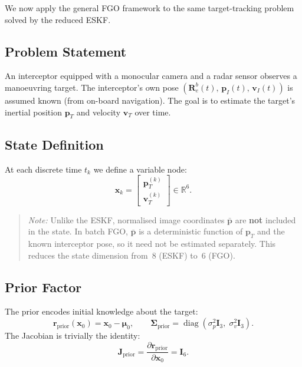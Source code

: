 \documentclass[11pt,a4paper]{article}
\newcommand{\state}{\bm{x}}
\newcommand{\resid}{\bm{r}}
\newcommand{\jac}{\bm{J}}
\newcommand{\eye}{\bm{I}}
\newcommand{\cov}{\bm{\Sigma}}
\newcommand{\R}{\mathbb{R}}
\DeclareMathOperator{\diag}{diag}
\begin{document}
We now apply the general FGO framework to the same target-tracking
problem solved by the reduced ESKF.

\subsection{Problem Statement}

An interceptor equipped with a monocular camera and a radar sensor
observes a manoeuvring target.  The interceptor's own pose
$(\bm{R}^b_e(t),\, \bm{p}_I(t),\, \bm{v}_I(t))$ is assumed known
(from on-board navigation).  The goal is to estimate the target's
inertial position $\bm{p}_T$ and velocity $\bm{v}_T$ over time.

\subsection{State Definition}

At each discrete time $t_k$ we define a variable node:
\begin{equation}
  \state_k
  = \begin{bmatrix} \bm{p}_T^{(k)} \\ \bm{v}_T^{(k)} \end{bmatrix}
  \in \R^{6}.
  \label{eq:state_def}
\end{equation}

\begin{quote}
\emph{Note:} Unlike the ESKF, normalised image coordinates $\bar{\bm{p}}$
are \textbf{not} included in the state.  In batch FGO, $\bar{\bm{p}}$
is a deterministic function of $\bm{p}_T$ and the known interceptor
pose, so it need not be estimated separately.  This reduces the state
dimension from~8 (ESKF) to~6 (FGO).
\end{quote}

\subsection{Prior Factor}
\label{sec:prior}

The prior encodes initial knowledge about the target:
\begin{equation}
  \resid_{\text{prior}}(\state_0)
  = \state_0 - \bm{\mu}_0,
  \qquad
  \cov_{\text{prior}} = \diag(\sigma_{p}^{2}\eye_3,\;
                              \sigma_{v}^{2}\eye_3).
\end{equation}
The Jacobian is trivially the identity:
\begin{equation}
  \jac_{\text{prior}} = \frac{\partial \resid_{\text{prior}}}
                              {\partial \state_0} = \eye_6.
\end{equation}
\end{document}
